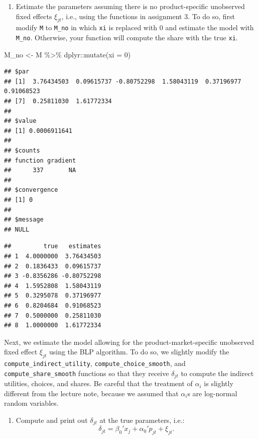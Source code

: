 \documentclass[
]{book}
\newenvironment{Shaded}{\begin{snugshade}}{\end{snugshade}}
\newcommand{\AttributeTok}[1]{\textcolor[rgb]{0.77,0.63,0.00}{#1}}
\newcommand{\DecValTok}[1]{\textcolor[rgb]{0.00,0.00,0.81}{#1}}
\newcommand{\FunctionTok}[1]{\textcolor[rgb]{0.00,0.00,0.00}{#1}}
\newcommand{\NormalTok}[1]{#1}
\newcommand{\OtherTok}[1]{\textcolor[rgb]{0.56,0.35,0.01}{#1}}
\newcommand{\SpecialCharTok}[1]{\textcolor[rgb]{0.00,0.00,0.00}{#1}}
\providecommand{\tightlist}{%
  \setlength{\itemsep}{0pt}\setlength{\parskip}{0pt}}
\begin{document}
\begin{enumerate}
\def\labelenumi{\arabic{enumi}.}
\setcounter{enumi}{2}
\tightlist
\item
  Estimate the parameters assuming there is no product-specific unobserved fixed effects \(\xi_{jt}\), i.e., using the functions in assignment 3. To do so, first modify \texttt{M} to \texttt{M\_no} in which \texttt{xi} is replaced with 0 and estimate the model with \texttt{M\_no}. Otherwise, your function will compute the share with the true \texttt{xi}.
\end{enumerate}

\begin{Shaded}
\begin{Highlighting}[]
\NormalTok{M\_no }\OtherTok{\textless{}{-}}\NormalTok{ M }\SpecialCharTok{\%\textgreater{}\%}
\NormalTok{  dplyr}\SpecialCharTok{::}\FunctionTok{mutate}\NormalTok{(}\AttributeTok{xi =} \DecValTok{0}\NormalTok{)}
\end{Highlighting}
\end{Shaded}

\begin{verbatim}
## $par
## [1]  3.76434503  0.09615737 -0.80752298  1.58043119  0.37196977  0.91068523
## [7]  0.25811030  1.61772334
## 
## $value
## [1] 0.0006911641
## 
## $counts
## function gradient 
##      337       NA 
## 
## $convergence
## [1] 0
## 
## $message
## NULL
\end{verbatim}

\begin{verbatim}
##         true   estimates
## 1  4.0000000  3.76434503
## 2  0.1836433  0.09615737
## 3 -0.8356286 -0.80752298
## 4  1.5952808  1.58043119
## 5  0.3295078  0.37196977
## 6  0.8204684  0.91068523
## 7  0.5000000  0.25811030
## 8  1.0000000  1.61772334
\end{verbatim}

Next, we estimate the model allowing for the product-market-specific unobserved fixed effect \(\xi_{jt}\) using the BLP algorithm. To do so, we slightly modify the \texttt{compute\_indirect\_utility}, \texttt{compute\_choice\_smooth}, and \texttt{compute\_share\_smooth} functions so that they receive \(\delta_{jt}\) to compute the indirect utilities, choices, and shares. Be careful that the treatment of \(\alpha_i\) is slightly different from the lecture note, because we assumed that \(\alpha_i\)s are log-normal random variables.

\begin{enumerate}
\def\labelenumi{\arabic{enumi}.}
\setcounter{enumi}{3}
\tightlist
\item
  Compute and print out \(\delta_{jt}\) at the true parameters, i.e.:
  \[
  \delta_{jt} = \beta_0' x_j + \alpha_0' p_{jt} + \xi_{jt}.
  \]
\end{enumerate}
\end{document}
